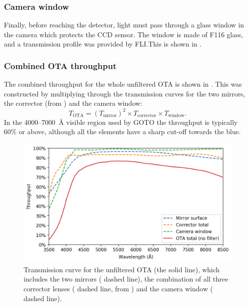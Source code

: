 \begin{colsection}
\subsubsection{Camera window}

Finally, before reaching the detector, light must pass through a glass window in the camera which protects the CCD sensor. The window is made of F116 glass, and a transmission profile was provided by FLI.\@ This is shown in .

\newpage

\subsubsection{Combined OTA throughput}

The combined throughput for the whole unfiltered OTA is shown in . This was constructed by multiplying through the transmission curves for the two mirrors, the corrector (from ) and the camera window:
%
\begin{equation}
    T_\text{OTA} = {(T_\text{mirror})}^2 \times T_\text{corrector} \times T_\text{window}.
    \label{eq:ota}
\end{equation}
%
In the 4000--\SI{7000}{\angstrom} visible region used by GOTO the throughput is typically 60\% or above, although all the elements have a sharp cut-off towards the blue.

\begin{figure}[t]
    \begin{center}
        \includegraphics[width=\linewidth]{images/throughput/trans_ota.png}
    \end{center}
    \caption[Combined OTA transmission curve]{
        Transmission curve for the unfiltered OTA (the  solid line), which includes the two mirrors ( dashed line), the combination of all three corrector lenses ( dashed line, from ) and the camera window ( dashed line).
    }\label{fig:trans_ota}
\end{figure}

\newpage

\end{colsection}

